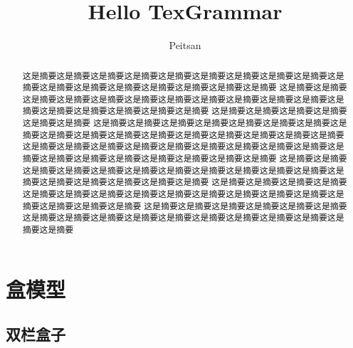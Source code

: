\documentclass[normalsize]{article}   %
\title{Hello TexGrammar}  %
\author{Peitsan}    %
\begin{document}
	\maketitle
	\begin{abstract}  %
		这是摘要这是摘要这是摘要这是摘要这是摘要这是摘要这是摘要这是摘要这是摘要这是摘要这是摘要这是摘要这是摘要这是摘要这是摘要这是摘要这是摘要	这是摘要这是摘要这是摘要这是摘要这是摘要这是摘要这是摘要这是摘要这是摘要这是摘要这是摘要这是摘要这是摘要这是摘要这是摘要这是摘要这是摘要	这是摘要这是摘要这是摘要这是摘要这是摘要这是摘要
		这是摘要这是摘要这是摘要这是摘要这是摘要这是摘要这是摘要这是摘要这是摘要这是摘要这是摘要这是摘要这是摘要这是摘要这是摘要这是摘要这是摘要	这是摘要这是摘要这是摘要这是摘要这是摘要这是摘要这是摘要这是摘要这是摘要这是摘要这是摘要这是摘要这是摘要这是摘要这是摘要这是摘要这是摘要	这是摘要这是摘要这是摘要这是摘要这是摘要这是摘要这是摘要这是摘要这是摘要这是摘要这是摘要这是摘要这是摘要这是摘要这是摘要这是摘要这是摘要	这是摘要这是摘要这是摘要这是摘要这是摘要这是摘要这是摘要这是摘要这是摘要这是摘要这是摘要这是摘要这是摘要这是摘要这是摘要这是摘要这是摘要	这是摘要这是摘要这是摘要这是摘要这是摘要这是摘要这是摘要这是摘要这是摘要这是摘要这是摘要这是摘要这是摘要这是摘要这是摘要这是摘要这是摘要
	\end{abstract}

\newpage

	\tableofcontents %
	
\newpage
	\section{盒模型}
	 
	  	\subsection{双栏盒子}
	  	
\end{document}
